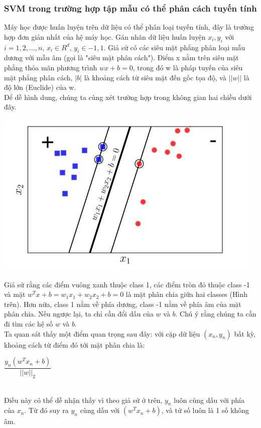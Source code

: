 \documentclass[12pt,a4paper]{article}
\begin{document}
\subsubsection{SVM trong trường hợp tập mẫu có thể phân cách tuyến tính}
\indent Máy học được huấn luyện trên dữ liệu có thể phân loại tuyến tính, đây là trường hợp đơn giản nhất của hệ máy học. Gán nhãn dữ liệu huấn luyện ${x_i,y_i}$ với $i=1,2,...,n$, $x_i \in R^d$, $y_i \in {-1,1}$. Giả sử có các siêu mặt phẳng phân loại mẫu dương với mẫu âm (gọi là "siêu mặt phân cách"). Điểm x nằm trên siêu mặt phẳng thỏa mãn phương trình $wx+b=0$, trong đó w là pháp tuyến của siêu mặt phẳng phân cách, $|b|$ là khoảng cách từ siêu mặt đến gốc tọa độ, và $||w||$ là độ lớn (Euclide) của w.\\
\indent Để dễ hình dung, chúng ta cùng xét trường hợp trong không gian hai chiều dưới đây.  
\begin{center}
    \includegraphics[scale=1]{img/img3}
\end{center}
\indent Giả sử rằng các điểm vuông xanh thuộc class 1, các điểm tròn đỏ thuộc class -1 và mặt $w^Tx+b=w_1x_1+w_2x_2+b=0$ là mặt phân chia giữa hai classes (Hình trên). Hơn nữa, class 1 nằm về phía dương, class -1 nằm về phía âm của mặt phân chia. Nếu ngược lại, ta chỉ cần đổi dấu của $w$ và $b$. Chú ý rằng chúng ta cần đi tìm các hệ số $w$ và $b$.\\
\indent Ta quan sát thấy một điểm quan trọng sau đây: với cặp dữ liệu $(x_n,y_n)$ bất kỳ, khoảng cách từ điểm đó tới mặt phân chia là: \\
\centerline{$\dfrac{y_n(w^Tx_n+b)}{||w||_2}$}\\
\indent Điều này có thể dễ nhận thấy vì theo giả sử ở trên, $y_n$ luôn cùng dấu với phía của $x_n$. Từ đó suy ra $y_n$ cùng dấu với $(w^Tx_n+b)$, và tử số luôn là 1 số không âm.\\
\end{document}
